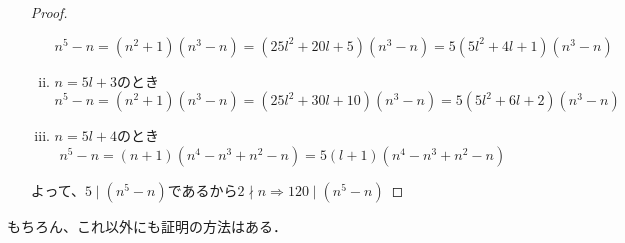 \documentclass[a4paper,12pt]{ltjsarticle}
\begin{document}
\begin{enumerate}[(1)]
\begin{proof}
\begin{enumerate}[(i)]
                    \begin{equation*}
                        n^5 - n = (n^2 + 1)(n^3 - n) = (25l^2 + 20l + 5)(n^3 - n) = 5(5l^2 + 4l + 1)(n^3 - n)
                    \end{equation*}
                \item $n = 5l + 3$のとき
                    \begin{equation*}
                        n^5 - n = (n^2 + 1)(n^3 - n) = (25l^2 + 30l + 10)(n^3 - n) = 5(5l^2 + 6l + 2)(n^3 - n)
                    \end{equation*}
                \item $n = 5l + 4$のとき
                    \begin{equation*}
                        n^5 - n = (n + 1)(n^4 - n^3 + n^2 - n) = 5(l + 1)(n^4 - n^3 + n^2 - n)
                    \end{equation*}
            \end{enumerate}
            よって、$5 \mid (n^5 - n)$であるから$2 \nmid n \Rightarrow 120 \mid (n^5 - n)$
        \end{proof}
\end{enumerate}
もちろん、これ以外にも証明の方法はある．
\end{document}
